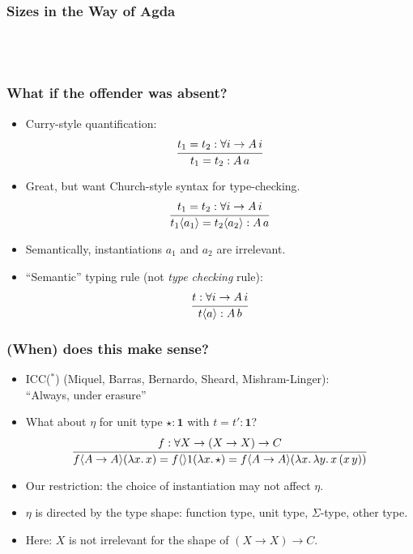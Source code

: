 \documentclass[t]{beamer}
\newcommand{\ONE}{\mathbf{1}}
\newcommand{\cAnn}{\color{red!80!black}}%
\renewcommand{\emph}[1]{{\cAnn#1}}
\begin{document}
\begin{frame}[fragile=singleslide]
  \frametitle{Sizes in the Way of Agda}

\aNat \\[2ex]

\aPredTy \\[2ex]

\aMonus
\end{frame}

\begin{frame}%
  \frametitle{What if the offender was absent?}
  \begin{itemize}
  \item Curry-style quantification:
\[
  \ru{t_1 = t_2 : \forall i \to A\,i
    }{t_1 = t_2 : A\,a}
\]
  \vspace{-1ex}
  \item Great, but want Church-style syntax for type-checking.
\[
  \ru{t_1 = t_2 : \forall i \to A\,i
    }{t_1 \ann {a_1} = t_2 \ann {a_2} : A\,a}
\]
  \vspace{-1ex}
  \item Semantically, instantiations $a_1$ and $a_2$ are \emph{irrelevant}.
  \item ``Semantic'' typing rule (\emph{not} \textit{type checking} rule):
\[
  \ru{t : \forall i \to A\,i
    }{t \ann a : A\,b}
\]

  \end{itemize}
\end{frame}

\begin{frame}%
  \frametitle{(When) does this make sense?}
\vspace{-2ex}
  \begin{itemize}
  \item ICC($^*$)  (Miquel, Barras, Bernardo, Sheard, Mishram-Linger): \\
    ``Always, under erasure''
  \item What about $\eta$ for unit type $\star : \ONE$ with $t = t' : \ONE$?
\[
\ru{f : \forall X \to (X \to X) \to C
  }{
    f \ann {A \to A} (\lambda x.\,x) =
    f \ann \ONE (\lambda x.\,\star) =
    f \ann {A \to A} (\lambda x.\, \lambda y.\,x\,(x\,y))
  }
\]
\vspace{-1ex}
  \item Our restriction: the choice of instantiation may not affect
    $\eta$.
  \item $\eta$ is directed by the type \emph{shape}: function type,
    unit type, $\Sigma$-type, other type.
  \item Here: $X$ is \emph{not} irrelevant for the shape of $(X \to X) \to C$.
  \end{itemize}
\end{frame}
\end{document}
